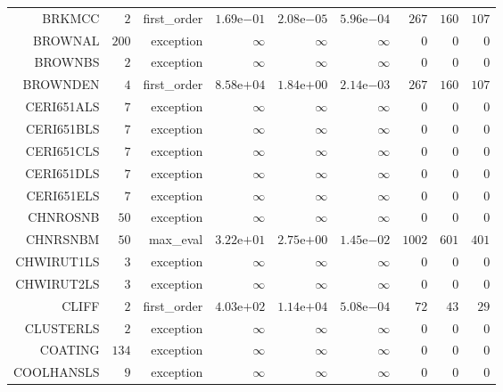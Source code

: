 \begin{longtable}{rrrrrrrrr}
BRKMCC & \(     2\) & first\_order & \( 1.69\)e\(-01\) & \( 2.08\)e\(-05\) & \( 5.96\)e\(-04\) & \(   267\) & \(   160\) & \(   107\) \\
BROWNAL & \(   200\) & exception & \(\infty\) & \(\infty\) & \(\infty\) & \(     0\) & \(     0\) & \(     0\) \\
BROWNBS & \(     2\) & exception & \(\infty\) & \(\infty\) & \(\infty\) & \(     0\) & \(     0\) & \(     0\) \\
BROWNDEN & \(     4\) & first\_order & \( 8.58\)e\(+04\) & \( 1.84\)e\(+00\) & \( 2.14\)e\(-03\) & \(   267\) & \(   160\) & \(   107\) \\
CERI651ALS & \(     7\) & exception & \(\infty\) & \(\infty\) & \(\infty\) & \(     0\) & \(     0\) & \(     0\) \\
CERI651BLS & \(     7\) & exception & \(\infty\) & \(\infty\) & \(\infty\) & \(     0\) & \(     0\) & \(     0\) \\
CERI651CLS & \(     7\) & exception & \(\infty\) & \(\infty\) & \(\infty\) & \(     0\) & \(     0\) & \(     0\) \\
CERI651DLS & \(     7\) & exception & \(\infty\) & \(\infty\) & \(\infty\) & \(     0\) & \(     0\) & \(     0\) \\
CERI651ELS & \(     7\) & exception & \(\infty\) & \(\infty\) & \(\infty\) & \(     0\) & \(     0\) & \(     0\) \\
CHNROSNB & \(    50\) & exception & \(\infty\) & \(\infty\) & \(\infty\) & \(     0\) & \(     0\) & \(     0\) \\
CHNRSNBM & \(    50\) & max\_eval & \( 3.22\)e\(+01\) & \( 2.75\)e\(+00\) & \( 1.45\)e\(-02\) & \(  1002\) & \(   601\) & \(   401\) \\
CHWIRUT1LS & \(     3\) & exception & \(\infty\) & \(\infty\) & \(\infty\) & \(     0\) & \(     0\) & \(     0\) \\
CHWIRUT2LS & \(     3\) & exception & \(\infty\) & \(\infty\) & \(\infty\) & \(     0\) & \(     0\) & \(     0\) \\
CLIFF & \(     2\) & first\_order & \( 4.03\)e\(+02\) & \( 1.14\)e\(+04\) & \( 5.08\)e\(-04\) & \(    72\) & \(    43\) & \(    29\) \\
CLUSTERLS & \(     2\) & exception & \(\infty\) & \(\infty\) & \(\infty\) & \(     0\) & \(     0\) & \(     0\) \\
COATING & \(   134\) & exception & \(\infty\) & \(\infty\) & \(\infty\) & \(     0\) & \(     0\) & \(     0\) \\
COOLHANSLS & \(     9\) & exception & \(\infty\) & \(\infty\) & \(\infty\) & \(     0\) & \(     0\) & \(     0\) \\

\end{longtable}
